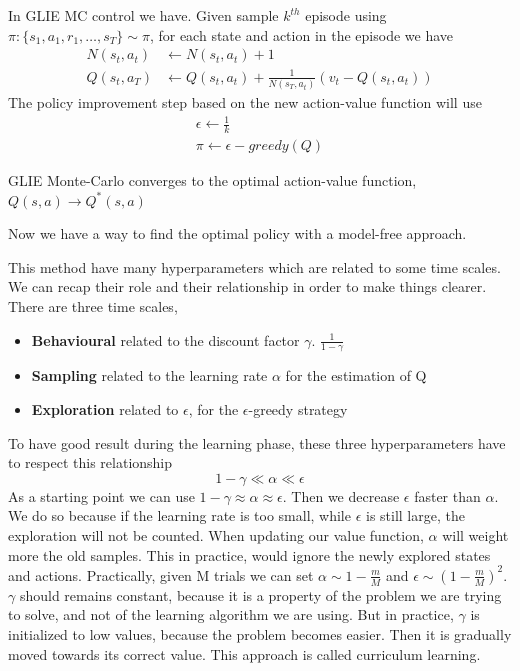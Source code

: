 \documentclass[../main.tex]{subfiles}
\begin{document}
\par\noindent
In GLIE MC control we have. Given sample $k^{th}$ episode using $\pi:\{ s_1,a_1,r_1,\dots,s_T \} \sim \pi$, for each state and action in the episode we have
\begin{align*}
    N(s_t,a_t)  & \leftarrow N(s_t,a_t) + 1                                      \\
    Q(s_t, a_T) & \leftarrow Q(s_t,a_t) + \frac{1}{N(s_T,a_t)}(v_t - Q(s_t,a_t))
\end{align*}
The policy improvement step based on the new action-value function will use
\begin{gather*}
    \epsilon \leftarrow \frac{1}{k} \\
    \pi \leftarrow \epsilon-greedy(Q)
\end{gather*}
\begin{theorem}
    GLIE Monte-Carlo converges to the optimal action-value function, $Q(s,a) \rightarrow Q^*(s,a)$
\end{theorem}
Now we have a way to find the optimal policy with a model-free approach.
\par\noindent
This method have many hyperparameters which are related to some time scales. We can recap their role and their relationship in order to make things clearer. There are three time scales,
\begin{itemize}
    \item \textbf{Behavioural} related to the discount factor $\gamma$. $\frac{1}{1-\gamma}$
    \item \textbf{Sampling} related to the learning rate $\alpha$ for the estimation of Q
    \item \textbf{Exploration} related to $\epsilon$, for the $\epsilon$-greedy strategy
\end{itemize}
To have good result during the learning phase, these three hyperparameters have to respect this relationship
\begin{equation*}
    1-\gamma \ll \alpha \ll \epsilon
\end{equation*}
As a starting point we can use $1-\gamma \approx \alpha \approx \epsilon$. Then we decrease $\epsilon$ faster than $\alpha$. We do so because if the learning rate is too small, while $\epsilon$ is still large, the exploration will not be counted. When updating our value function, $\alpha$ will weight more the old samples. This in practice, would ignore the newly explored states and actions.
Practically, given M trials we can set $\alpha \sim 1- \frac{m}{M}$ and $\epsilon \sim (1-\frac{m}{M})^2$. $\gamma$ should remains constant, because it is a property of the problem we are trying to solve, and not of the learning algorithm we are using. But in practice, $\gamma$ is initialized to low values, because the problem becomes easier. Then it is gradually moved towards its correct value. This approach is called curriculum learning.
\end{document}
